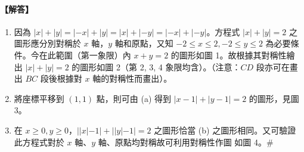 \paragraph{【解答】}
\begin{enumerate}[label=(\alph*), leftmargin=2em]
  \item 因為 $|x|+|y| = |-x|+|y| = |x|+|-y| = |-x|+|-y|$。方程式 $|x|+|y|=2$ 之圖形應分別對稱於 $x$ 軸，$y$ 軸和原點，又知 $-2\le x\le 2, -2\le y\le 2$ 為必要條件。今在此範圍（第一象限）內 $x+y=2$ 的圖形如圖 1。故根據其對稱性繪出 $|x|+|y|=2$ 的圖形如圖 2（第 2, 3, 4 象限均含）。（注意：$CD$ 段亦可在畫出 $BC$ 段後根據對 $x$ 軸的對稱性而畫出）。
  \item 將座標平移到 $(1,1)$ 點，則可由 (a) 得到 $|x-1|+|y-1|=2$ 的圖形，見圖 3。
  \item 在 $x\ge 0, y\ge 0$，$||x|-1|+||y|-1|=2$ 之圖形恰當 (b) 之圖形相同。又可驗證此方程式對於 $x$ 軸、$y$ 軸、原點均對稱故可利用對稱性作圖 如圖 4。\hfill$\#$
\end{enumerate}

